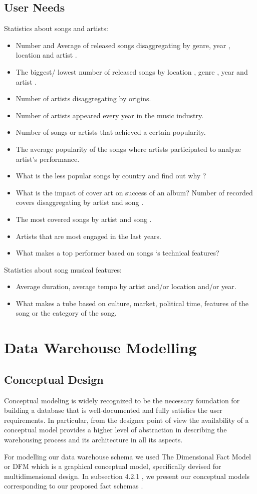 \documentclass[12pt]{article}
\begin{document}
\subsection{User Needs}
Statistics about songs and artists:
\begin{itemize}
\item Number and Average of  released songs disaggregating by genre, year , location and artist .
\item The biggest/ lowest number of released songs by location , genre , year and artist .
\item Number of  artists disaggregating by origins.
\item Number of artists appeared every year in the music industry.
\item Number of songs or artists that achieved a certain popularity.
\item The average popularity of the songs where artists participated to analyze artist's performance.
\item What is the less popular songs by country and find out why ?
\item What is the impact of cover art on success of an album?
Number of  recorded covers disaggregating  by artist and song .
\item The most covered songs by artist and song  .
\item Artists that are most engaged in the last years.
\item What makes a  top performer based on songs ‘s technical features?
\end{itemize}
Statistics about song musical features:
\begin{itemize}
\item Average duration, average tempo by artist and/or location and/or year.
\item What makes a tube based on culture, market, political time, features of the song or the category of the song.
\end{itemize}


\section{Data Warehouse Modelling }
\subsection{Conceptual Design}
Conceptual modeling is widely recognized to be the necessary foundation for building a database that
is well-documented and fully satisfies the user requirements. In particular, from the designer point of
view the availability of a conceptual model provides a higher level of abstraction in describing the
warehousing process and its architecture in all its aspects. 
~\par For modelling our data warehouse schema we used The Dimensional Fact Model or DFM which is a graphical conceptual model, specifically devised for multidimensional design.
In subsection 4.2.1 , we present our conceptual models corresponding to our proposed fact schemas .
\end{document}
